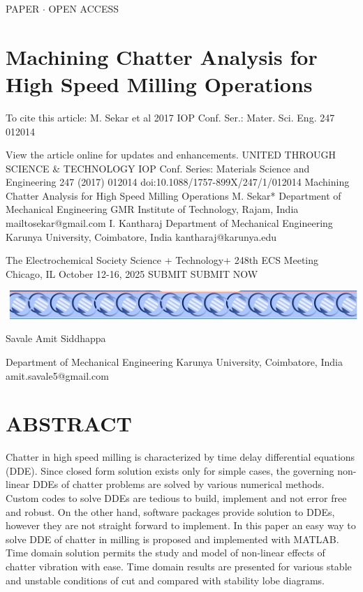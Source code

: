 \documentclass[10pt]{article}
\begin{document}
PAPER \(\cdot\) OPEN ACCESS

\section*{Machining Chatter Analysis for High Speed Milling Operations}

To cite this article: M. Sekar et al 2017 IOP Conf. Ser.: Mater. Sci. Eng. 247 012014

View the article online for updates and enhancements. UNITED THROUGH SCIENCE \& TECHNOLOGY IOP Conf. Series: Materials Science and Engineering 247 (2017) 012014 doi:10.1088/1757-899X/247/1/012014 Machining Chatter Analysis for High Speed Milling Operations M. Sekar* Department of Mechanical Engineering GMR Institute of Technology, Rajam, India mailtosekar@gmail.com I. Kantharaj Department of Mechanical Engineering Karunya University, Coimbatore, India kantharaj@karunya.edu

The Electrochemical Society Science + Technology+ 248th ECS Meeting Chicago, IL October 12-16, 2025 SUBMIT SUBMIT NOW

\begin{center}
\includegraphics[max width=1.0\textwidth]{images/01948e67-2b92-7dd1-b16f-a9746c8d80be_0_87_2083_1464_118_0.jpg}
\end{center}
\hspace*{3em} 

Savale Amit Siddhappa

Department of Mechanical Engineering Karunya University, Coimbatore, India amit.savale5@gmail.com

\section*{ABSTRACT}

Chatter in high speed milling is characterized by time delay differential equations (DDE). Since closed form solution exists only for simple cases, the governing non-linear DDEs of chatter problems are solved by various numerical methods. Custom codes to solve DDEs are tedious to build, implement and not error free and robust. On the other hand, software packages provide solution to DDEs, however they are not straight forward to implement. In this paper an easy way to solve DDE of chatter in milling is proposed and implemented with MATLAB. Time domain solution permits the study and model of non-linear effects of chatter vibration with ease. Time domain results are presented for various stable and unstable conditions of cut and compared with stability lobe diagrams.
\end{document}
